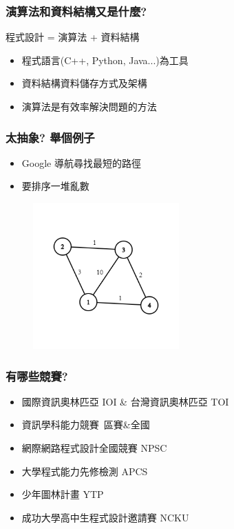 \documentclass[mathserif]{beamer}
\begin{document}
    \begin{frame}
        \frametitle{演算法和資料結構又是什麼?}
        \begin{center}
            程式設計 = 演算法 + 資料結構
        \end{center}

        \begin{itemize}
            \item 程式語言(C++, Python, Java...)為工具
            \pause
            \item 資料結構資料儲存方式及架構
            \pause
            \item 演算法是有效率解決問題的方法
            
        \end{itemize}

    \end{frame}

    \begin{frame}
        \frametitle{太抽象? 舉個例子}
        \begin{itemize}
            \item Google 導航尋找最短的路徑
            \item 要排序一堆亂數
        \end{itemize}
        \begin{figure}[H]
            \flushright
            \centering
            \includegraphics[width=0.5\textwidth]{graph} 
        \end{figure}
    \end{frame}

    \begin{frame}
        \frametitle{有哪些競賽?}
        \begin{itemize}
            \item 國際資訊奧林匹亞 IOI \& 台灣資訊奧林匹亞 TOI
            \item 資訊學科能力競賽\ 區賽\&全國
            \item 網際網路程式設計全國競賽 NPSC
            \item 大學程式能力先修檢測 APCS
            \item 少年圖林計畫 YTP
            \item 成功大學高中生程式設計邀請賽 NCKU
        \end{itemize}
    \end{frame}
\end{document}

